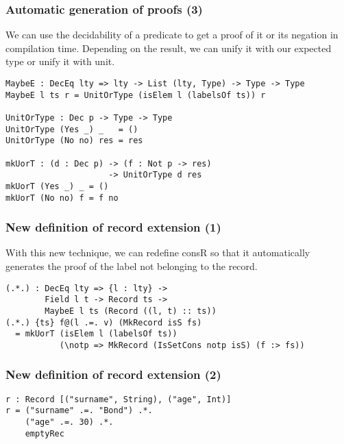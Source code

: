 \documentclass{beamer}
\begin{document}
\begin{frame}[fragile]
\frametitle{Automatic generation of proofs (3)}

We can use the decidability of a predicate to get a proof of it or its negation in compilation time. Depending on the result, we can unify it with our expected type or unify it with unit.

\pause

\begin{definition}
\begin{verbatim}
MaybeE : DecEq lty => lty -> List (lty, Type) -> Type -> Type
MaybeE l ts r = UnitOrType (isElem l (labelsOf ts)) r

UnitOrType : Dec p -> Type -> Type
UnitOrType (Yes _) _   = ()
UnitOrType (No no) res = res

mkUorT : (d : Dec p) -> (f : Not p -> res)
                     -> UnitOrType d res
mkUorT (Yes _) _ = ()
mkUorT (No no) f = f no
\end{verbatim}
\end{definition}

\end{frame}

\begin{frame}[fragile]
\frametitle{New definition of record extension (1)}

With this new technique, we can redefine consR so that it automatically generates the proof of the label not belonging to the record.

\pause

\begin{definition}
\begin{verbatim}
(.*.) : DecEq lty => {l : lty} ->
        Field l t -> Record ts ->
        MaybeE l ts (Record ((l, t) :: ts))
(.*.) {ts} f@(l .=. v) (MkRecord isS fs)
  = mkUorT (isElem l (labelsOf ts))
           (\notp => MkRecord (IsSetCons notp isS) (f :> fs))
\end{verbatim}
\end{definition}

\end{frame}

\begin{frame}[fragile]
\frametitle{New definition of record extension (2)}

\begin{example}
\begin{verbatim}
r : Record [("surname", String), ("age", Int)]
r = ("surname" .=. "Bond") .*.
    ("age" .=. 30) .*.
    emptyRec
\end{verbatim}
\end{example}

\end{frame}
\end{document}

